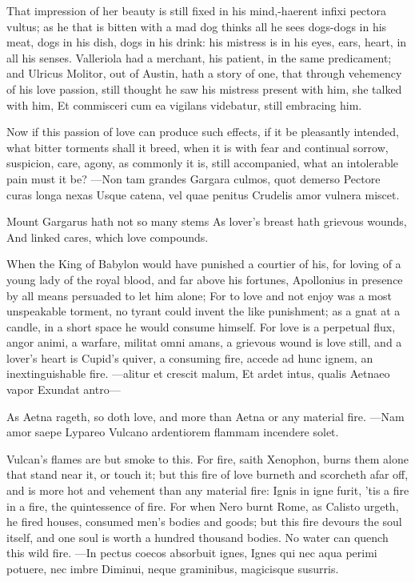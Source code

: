 {That impression of her beauty is still fixed in his mind,-haerent
infixi pectora vultus; as he that is bitten with a mad dog thinks all
he sees dogs-dogs in his meat, dogs in his dish, dogs in his drink: his
mistress is in his eyes, ears, heart, in all his senses. Valleriola had
a merchant, his patient, in the same predicament; and Ulricus
Molitor, out of Austin, hath a story of one, that through vehemency of
his love passion, still thought he saw his mistress present with him,
she talked with him, Et commisceri cum ea vigilans videbatur, still
embracing him.

Now if this passion of love can produce such effects, if it be
pleasantly intended, what bitter torments shall it breed, when it is
with fear and continual sorrow, suspicion, care, agony, as commonly it
is, still accompanied, what an intolerable pain must it be?
---Non tam grandes
Gargara culmos, quot demerso
Pectore curas longa nexas
Usque catena, vel quae penitus
Crudelis amor vulnera miscet.

Mount Gargarus hath not so many stems
As lover's breast hath grievous wounds,
And linked cares, which love compounds.

When the King of Babylon would have punished a courtier of his, for
loving of a young lady of the royal blood, and far above his fortunes,
 Apollonius in presence by all means persuaded to let him alone;
For to love and not enjoy was a most unspeakable torment, no tyrant
could invent the like punishment; as a gnat at a candle, in a short
space he would consume himself. For love is a perpetual flux,
angor animi, a warfare, militat omni amans, a grievous wound is love
still, and a lover's heart is Cupid's quiver, a consuming fire,
accede ad hunc ignem, \etc{} an inextinguishable fire.
---alitur et crescit malum,
Et ardet intus, qualis Aetnaeo vapor
Exundat antro---

As Aetna rageth, so doth love, and more than Aetna or any material
fire.
---Nam amor saepe Lypareo
Vulcano ardentiorem flammam incendere solet.

Vulcan's flames are but smoke to this. For fire, saith Xenophon,
burns them alone that stand near it, or touch it; but this fire of love
burneth and scorcheth afar off, and is more hot and vehement than any
material fire: Ignis in igne furit, 'tis a fire in a fire, the
quintessence of fire. For when Nero burnt Rome, as Calisto urgeth, he
fired houses, consumed men's bodies and goods; but this fire devours
the soul itself, and one soul is worth a hundred thousand bodies.
No water can quench this wild fire.
---In pectus coecos absorbuit ignes,
Ignes qui nec aqua perimi potuere, nec imbre
Diminui, neque graminibus, magicisque susurris.


}
